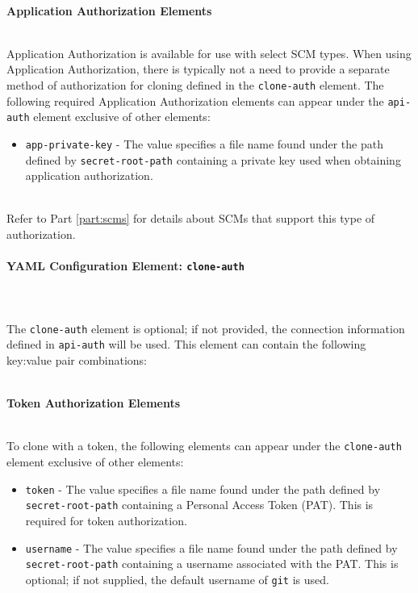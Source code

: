 \noindent\\\textbf{Application Authorization Elements}

\noindent\\Application Authorization is available for use with select SCM types.  When using Application Authorization, there is typically not a need
to provide a separate method of authorization for cloning defined in the \texttt{clone-auth} element. The following required
Application Authorization elements can appear under the \texttt{api-auth} element exclusive of other elements:

\begin{itemize}
    \item \texttt{app-private-key} - The value specifies a file name found under the path defined
    by \texttt{secret-root-path} containing a private key used when obtaining application authorization. 
\end{itemize}

\noindent\\Refer to Part \ref{part:scms} for details about SCMs that support this type of authorization. 


\paragraph{YAML Configuration Element: \texttt{clone-auth} }\label{sec:clone-auth-element}

\noindent\\\\The \texttt{clone-auth} element is optional;  if not provided, the connection information defined
in \texttt{api-auth} will be used.  This element can contain the following key:value pair combinations:

\noindent\\\textbf{Token Authorization Elements}

\noindent\\To clone with a token, the following elements can appear under the \texttt{clone-auth}
element exclusive of other elements:

\begin{itemize}
    \item \texttt{token} - The value specifies a file name found under the path defined
    by \texttt{secret-root-path} containing a Personal Access Token (PAT).  This is required for
    token authorization.
    \item \texttt{username} - The value specifies a file name found under the path defined
    by \texttt{secret-root-path} containing a username associated with the PAT.  This is 
    optional; if not supplied, the default username of \texttt{git} is used.
\end{itemize}

